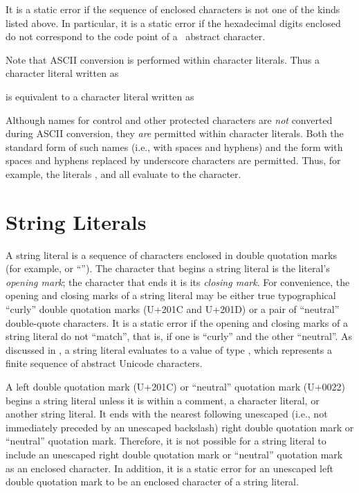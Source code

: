 It is a static error if
the sequence of enclosed characters is not
one of the kinds listed above.
In particular,
it is a static error if the hexadecimal digits enclosed
do not correspond to the code point of a \unicode\ abstract character.

Note that ASCII conversion is performed within character literals.
Thus a character literal written as
\begin{quote}
\end{quote}
is equivalent to a character literal written as
\begin{quote}
\end{quote}

Although names for control and other protected characters
are \emph{not} converted during ASCII conversion,
they \emph{are} permitted within character literals.
Both the standard form of such names
(i.e., with spaces and hyphens)
and the form with spaces and hyphens replaced by underscore characters
are permitted.
Thus, for example,
the literals ,  and 
all evaluate to the  character.


\section{String Literals}

A string literal is a sequence of characters
enclosed in double quotation marks
(for example,  or
``'').
The character that begins a string literal
is the literal's \emph{opening mark};
the character that ends it is its \emph{closing mark}.
For convenience,
the opening and closing marks of a string literal may be either
true typographical ``curly'' double quotation marks (U+201C and U+201D)
or a pair of ``neutral'' double-quote characters.
It is a static error
if the opening and closing marks of a string literal
do not ``match'',
that is, if one is ``curly''
and the other ``neutral''.
As discussed in ,
a string literal evaluates to a value of type ,
which represents a finite sequence of abstract Unicode characters.

A left double quotation mark (U+201C)
or ``neutral'' quotation mark (U+0022)
begins a string literal
unless it is within a comment, a character literal,
or another string literal.
It ends with the nearest following unescaped
(i.e., not immediately preceded by an unescaped backslash)
right double quotation mark or ``neutral'' quotation mark.
Therefore, it is not possible for a string literal
to include an unescaped right double quotation mark
or ``neutral'' quotation mark
as an enclosed character.
In addition,
it is a static error for an unescaped
left double quotation mark
to be an enclosed character of a string literal.

